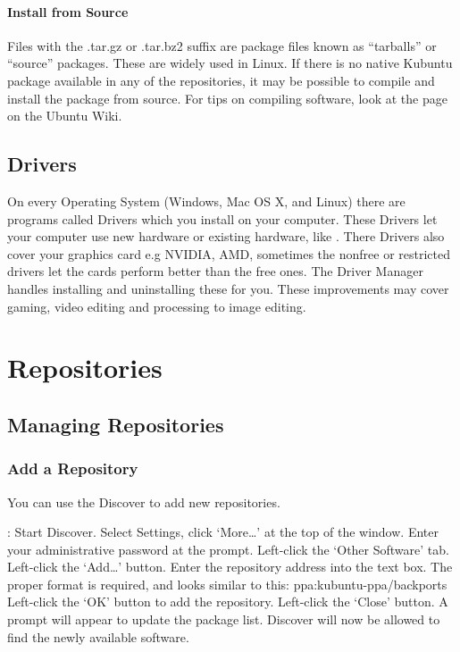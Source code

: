 \documentclass[letterpaper,10pt,english]{sphinxmanual}
\begin{document}
\subsubsection{Install from Source}
\label{\detokenize{docs/advanced:install-from-source}}
Files with the .tar.gz or .tar.bz2 suffix are package files known as “tarballs” or “source” packages. These are widely used in Linux. If there is no native Kubuntu package available in any of the repositories, it may be possible to compile and install the package from source. For tips on compiling software, look at the  page on the Ubuntu Wiki.


\section{Drivers}
\label{\detokenize{docs/advanced:drivers}}
On every Operating System (Windows, Mac OS X, and Linux) there are programs called Drivers which you install on your computer. These Drivers let your computer use new hardware or existing hardware, like . There Drivers also cover your graphics card e.g NVIDIA, AMD, sometimes the nonfree or restricted drivers let the cards perform better than the free ones. The Driver Manager handles installing and uninstalling these for you. These improvements may cover gaming, video editing and processing to image editing.


\chapter{Repositories}
\label{\detokenize{docs/repositories:repositories}}\label{\detokenize{docs/repositories:repositories-link}}\label{\detokenize{docs/repositories::doc}}

\section{Managing Repositories}
\label{\detokenize{docs/repositories:managing-repositories}}

\subsection{Add a Repository}
\label{\detokenize{docs/repositories:add-a-repository}}
You can use the Discover to add new repositories.

: Start Discover. Select Settings, click ‘More…’ at the top of the window. Enter your administrative password at the prompt. Left-click the ‘Other Software’ tab. Left-click the ‘Add…’ button. Enter the repository address into the text box. The proper format is required, and looks similar to this: ppa:kubuntu-ppa/backports Left-click the ‘OK’ button to add the repository. Left-click the ‘Close’ button. A prompt will appear to update the package list. Discover will now be allowed to find the newly available software.
\end{document}
